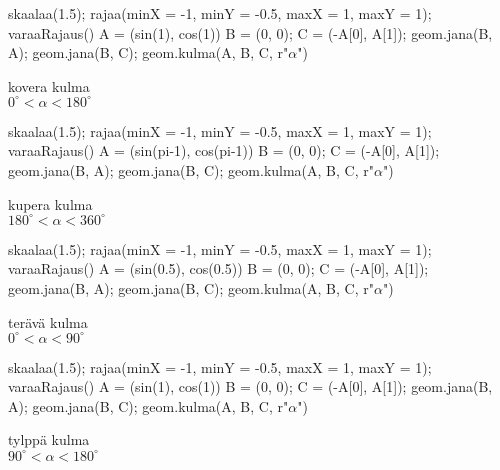 \begin{minipage}{3cm}
\begin{kuva}
skaalaa(1.5); rajaa(minX = -1, minY = -0.5, maxX = 1, maxY = 1); varaaRajaus()
A = (sin(1), cos(1))
B = (0, 0); C = (-A[0], A[1]); geom.jana(B, A); geom.jana(B, C); geom.kulma(A, B, C, r"$\alpha$")
\end{kuva}
\centering kovera kulma \\$0^\circ < \alpha < 180^\circ$
\end{minipage}
\begin{minipage}{3cm}
\begin{kuva}
skaalaa(1.5); rajaa(minX = -1, minY = -0.5, maxX = 1, maxY = 1); varaaRajaus()
A = (sin(pi-1), cos(pi-1))
B = (0, 0); C = (-A[0], A[1]); geom.jana(B, A); geom.jana(B, C); geom.kulma(A, B, C, r"$\alpha$")
\end{kuva}
\centering kupera kulma \\$180^\circ < \alpha < 360^\circ$
\end{minipage}
\begin{minipage}{3cm}
\begin{kuva}
skaalaa(1.5); rajaa(minX = -1, minY = -0.5, maxX = 1, maxY = 1); varaaRajaus()
A = (sin(0.5), cos(0.5))
B = (0, 0); C = (-A[0], A[1]); geom.jana(B, A); geom.jana(B, C); geom.kulma(A, B, C, r"$\alpha$")
\end{kuva}
\centering terävä kulma \\$0^\circ < \alpha < 90^\circ$
\end{minipage}
\begin{minipage}{3cm}
\begin{kuva}
skaalaa(1.5); rajaa(minX = -1, minY = -0.5, maxX = 1, maxY = 1); varaaRajaus()
A = (sin(1), cos(1))
B = (0, 0); C = (-A[0], A[1]); geom.jana(B, A); geom.jana(B, C); geom.kulma(A, B, C, r"$\alpha$")
\end{kuva}
\centering tylppä kulma \\$90^\circ < \alpha < 180^\circ$
\end{minipage}

